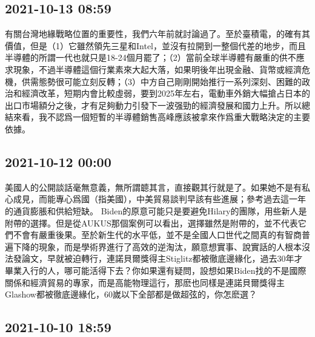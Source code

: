 \documentclass[twocolumn]{ctexart}
\begin{document}
\subsection*{2021-10-13 08:59}

有關台灣地緣戰略位置的重要性，我們六年前就討論過了。至於臺積電，的確有其價值，但是（1）它雖然領先三星和Intel，並沒有拉開到一整個代差的地步，而且半導體的所謂一代也就只是18-24個月罷了；（2）當前全球半導體有嚴重的供不應求現象，不過半導體這個行業素來大起大落，如果明後年出現金融、貨幣或經濟危機，供需態勢很可能立刻反轉；（3）中方自己剛剛開始推行一系列深刻、困難的政治和經濟改革，短期内會比較虛弱，要到2025年左右，電動車外銷大幅搶占日本的出口市場額分之後，才有足夠動力引發下一波强勁的經濟發展和國力上升。所以總結來看，我不認爲一個短暫的半導體銷售高峰應該被拿來作爲重大戰略決定的主要依據。
\subsection*{2021-10-12 00:00}

美國人的公開談話毫無意義，無所謂聼其言，直接觀其行就是了。如果她不是有私心成見，而能專心爲國（指美國），中美貿易談判早該有些進展；參考過去這一年的通貨膨脹和供給短缺。
Biden的原意可能只是要避免Hilary的團隊，用些新人是附帶的選擇。但是從AUKUS那個案例可以看出，選擇雖然是附帶的，並不代表它們不會有嚴重後果。至於新生代的水平低，並不是全國人口世代之間真的有智商普遍下降的現象，而是學術界進行了高效的逆淘汰，願意想實事、說實話的人根本沒法發論文，早就被迫轉行，連諾貝爾獎得主Stiglitz都被徹底邊緣化，過去30年才畢業入行的人，哪可能活得下去？你如果還有疑問，設想如果Biden找的不是國際關係和經濟貿易的專家，而是高能物理這行，那麽也同樣是連諾貝爾獎得主Glashow都被徹底邊緣化，60嵗以下全部都是做超弦的，你怎麽選？
\subsection*{2021-10-10 18:59}
\end{document}
